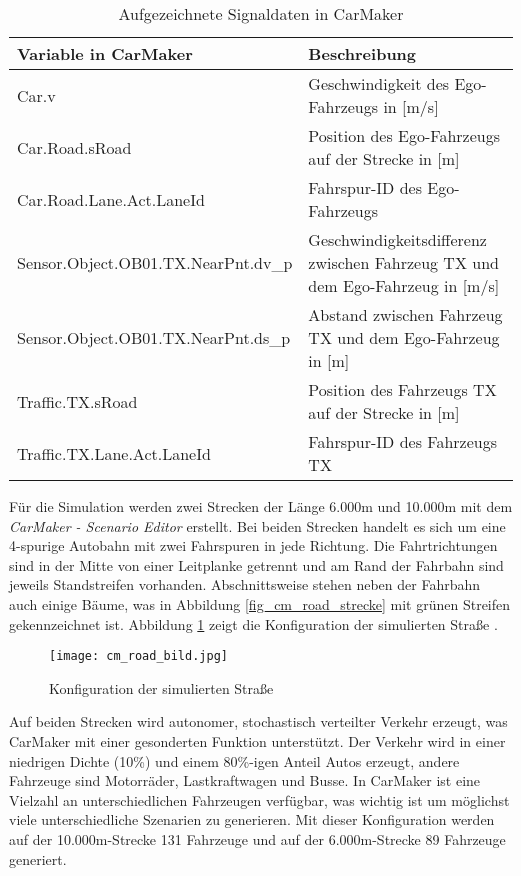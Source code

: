 \begin{table}[h]
\small
\centering
\def\arraystretch{1.4}
\begin{tabular}{p{6.2cm} p{7.5cm}}
\textbf{Variable in CarMaker} & \textbf{Beschreibung} \\
\hline

Car.v & Geschwindigkeit des Ego-Fahrzeugs in [m/s] \\
Car.Road.sRoad & Position des Ego-Fahrzeugs auf der Strecke in [m] \\
Car.Road.Lane.Act.LaneId & Fahrspur-ID des Ego-Fahrzeugs \\
\hline
Sensor.Object.OB01.TX.NearPnt.dv\_p & Geschwindigkeitsdifferenz zwischen Fahrzeug TX und dem Ego-Fahrzeug in [m/s] \\
Sensor.Object.OB01.TX.NearPnt.ds\_p & Abstand zwischen Fahrzeug TX und dem Ego-Fahrzeug in [m] \\
\hline
Traffic.TX.sRoad & Position des Fahrzeugs TX auf der Strecke in [m] \\
Traffic.TX.Lane.Act.LaneId & Fahrspur-ID des Fahrzeugs TX \\
\hline

\end{tabular}
\caption{Aufgezeichnete Signaldaten in CarMaker}
\label{tab_output_quantities}
\end{table}

Für die Simulation werden zwei Strecken der Länge 6.000m und 10.000m mit dem \textit{CarMaker - Scenario Editor} erstellt. Bei beiden Strecken handelt es sich um eine 4-spurige Autobahn mit zwei Fahrspuren in jede Richtung. Die Fahrtrichtungen sind in der Mitte von einer Leitplanke getrennt und am Rand der Fahrbahn sind jeweils Standstreifen vorhanden. Abschnittsweise stehen neben der Fahrbahn auch einige Bäume, was in Abbildung \ref{fig_cm_road_strecke} mit grünen Streifen gekennzeichnet ist. Abbildung \ref{fig_cm_road_bild} zeigt die Konfiguration der simulierten Straße .

\begin{figure}[h]
\centering
\texttt{[image: cm\_road\_bild.jpg]}
\caption{Konfiguration der simulierten Straße \cite{ipg2018carmaker}}
\label{fig_cm_road_bild}
\end{figure}

Auf beiden Strecken wird autonomer, stochastisch verteilter Verkehr erzeugt, was CarMaker mit einer gesonderten Funktion unterstützt. Der Verkehr wird in einer niedrigen Dichte (10\%) und einem 80\%-igen Anteil Autos erzeugt, andere Fahrzeuge sind Motorräder, Lastkraftwagen und Busse. In CarMaker ist eine Vielzahl an unterschiedlichen Fahrzeugen verfügbar, was wichtig ist um möglichst viele unterschiedliche Szenarien zu generieren. Mit dieser Konfiguration werden auf der 10.000m-Strecke 131 Fahrzeuge und auf der 6.000m-Strecke 89 Fahrzeuge generiert.


